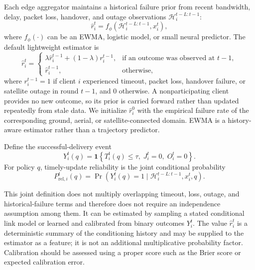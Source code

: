 \documentclass[preprint,12pt]{elsarticle}
\begin{document}
Each edge aggregator maintains a historical failure prior from recent bandwidth, delay, packet loss, handover, and outage observations $\mathcal{H}_i^{t-L:t-1}$:
\begin{equation}
	\hat{r}_i^t = f_{\phi}\left(\mathcal{H}_i^{t-L:t-1}, x_i^t\right),
\end{equation}
where $f_{\phi}(\cdot)$ can be an EWMA, logistic model, or small neural predictor. The default lightweight estimator is
\begin{equation}
	\hat{r}_i^t =
	\begin{cases}
	\lambda \hat{r}_i^{t-1}+(1-\lambda)r_i^{t-1},
	& \text{if an outcome was observed at }t-1,\\
	\hat{r}_i^{t-1}, & \text{otherwise},
	\end{cases}
	\label{eq:ewma}
\end{equation}
where $r_i^{t-1}=1$ if client $i$ experienced timeout, packet loss, handover failure, or satellite outage in round $t-1$, and $0$ otherwise. A nonparticipating client provides no new outcome, so its prior is carried forward rather than updated repeatedly from stale data. We initialize $\hat r_i^0$ with the empirical failure rate of the corresponding ground, aerial, or satellite-connected domain. EWMA is a history-aware estimator rather than a trajectory predictor.

Define the successful-delivery event
\begin{equation}
	Y_i^t(q)=\mathbf{1}\!\left\{T_i^t(q)\leq\tau,\;J_i^t=0,\;O_i^t=0\right\}.
	\label{eq:success_event}
\end{equation}
For policy $q$, timely-update reliability is the joint conditional probability
\begin{equation}
	P_{\mathrm{rel},i}^{t}(q)
	=
	\Pr\!\left(Y_i^t(q)=1\mid \mathcal{H}_i^{t-L:t-1},x_i^t,q\right).
	\label{eq:reliability_score}
\end{equation}

This joint definition does not multiply overlapping timeout, loss, outage, and historical-failure terms and therefore does not require an independence assumption among them. It can be estimated by sampling a stated conditional link model or learned and calibrated from binary outcomes $Y_i^t$. The value $\hat r_i^t$ is a deterministic summary of the conditioning history and may be supplied to the estimator as a feature; it is not an additional multiplicative probability factor. Calibration should be assessed using a proper score such as the Brier score or expected calibration error.
\end{document}
